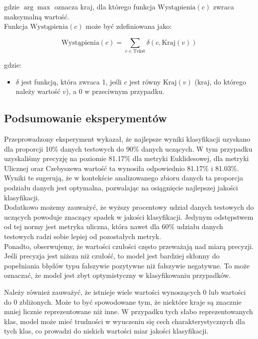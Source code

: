 \documentclass{article}
\begin{document}
\noindent gdzie $\arg\max$ oznacza kraj, dla którego funkcja $\text{Wystąpienia}(c)$ zwraca maksymalną wartość. \\

Funkcja $\text{Wystąpienia}(c)$ może być zdefiniowana jako:

\begin{equation}
\text{Wystąpienia}(c) = \sum_{v \in \text{Tekst}} \delta(c, \text{Kraj}(v))
\end{equation}

gdzie:
\begin{itemize}
    \item $\delta$ jest funkcją, która zwraca 1, jeśli $c$ jest równy $\text{Kraj}(v)$ (kraj, do którego należy wartość $v$), a 0 w przeciwnym przypadku.
\end{itemize}

\subsection*{Podsumowanie eksperymentów}

\noindent Przeprowadzony eksperyment wykazał, że najlepsze wyniki klasyfikacji uzyskano dla proporcji 10\% danych testowych do 90\% danych uczących. W tym przypadku uzyskaliśmy precyzję na poziomie 81.17\% dla metryki Euklidesowej, dla metryki Ulicznej oraz Czebyszewa wartość ta wynosiła odpowiednio 81.17\% i 81.03\%. Wyniki te sugerują, że w kontekście analizowanego zbioru danych ta proporcja podziału danych jest optymalna, pozwalając na osiągnięcie najlepszej jakości klasyfikacji. \\

\noindent Dodatkowo możemy zauważyć, że wyższy procentowy udział danych testowych do uczących powoduje znaczący spadek w jakości klasyfikacji. Jedynym odstępstwem od tej normy jest metryka uliczna, która nawet dla 60\% udziału danych testowych radzi sobie lepiej od pozostałych metryk. \\

\noindent Ponadto, obserwujemy, że wartości czułości często przeważają nad miarą precyzji. Jeśli precyzja jest niższa niż czułość, to model jest bardziej skłonny do popełniania błędów typu fałszywie pozytywne niż fałszywie negatywne. To może oznaczać, że model jest zbyt optymistyczny w klasyfikowaniu przypadków. \\

\newpage

\noindent Należy również zauważyć, że istnieje wiele wartości wynoszących 0 lub wartości do 0 zbliżonych. Może to być spowodowane tym, że niektóre kraje są znacznie mniej licznie reprezentowane niż inne. W przypadku tych słabo reprezentowanych klas, model może mieć trudności w wyuczeniu się cech charakterystycznych dla tych klas, co prowadzi do niskich wartości miar jakości klasyfikacji. \\
\end{document}
